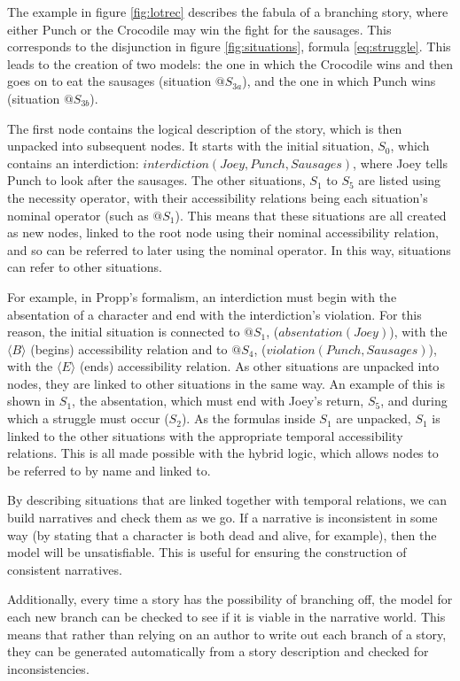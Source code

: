 \documentclass{llncs}
\begin{document}
The example in figure \ref{fig:lotrec} describes the fabula of a branching story, where either Punch or the Crocodile may win the fight for the sausages. This corresponds to the disjunction in figure \ref{fig:situations}, formula \ref{eq:struggle}. This leads to the creation of two models: the one in which the Crocodile wins and then goes on to eat the sausages (situation $@S_{3a}$), and the one in which Punch wins (situation $@S_{3b}$).

The first node contains the logical description of the story, which is then unpacked into subsequent nodes. It starts with the initial situation, $S_0$, which contains an interdiction: $\mathit{interdiction(Joey, Punch, Sausages)}$, where Joey tells Punch to look after the sausages. The other situations, $S_1$ to $S_5$ are listed using the necessity operator, with their accessibility relations being each situation's nominal operator (such as $@S_1$). This means that these situations are all created as new nodes, linked to the root node using their nominal accessibility relation, and so can be referred to later using the nominal operator. In this way, situations can refer to other situations.

For example, in Propp's formalism, an interdiction must begin with the absentation of a character and end with the interdiction's violation. For this reason, the initial situation is connected to $@S_1$, ($\mathit{absentation(Joey)}$), with the $\langle B \rangle$ (begins) accessibility relation and to $@S_4$, ($\mathit{violation(Punch, Sausages)}$), with the $\langle E \rangle$ (ends) accessibility relation. As other situations are unpacked into nodes, they are linked to other situations in the same way. An example of this is shown in $S_1$, the absentation, which must end with Joey's return, $S_5$, and during which a struggle must occur ($S_2$). As the formulas inside $S_1$ are unpacked, $S_1$ is linked to the other situations with the appropriate temporal accessibility relations. This is all made possible with the hybrid logic, which allows nodes to be referred to by name and linked to.

By describing situations that are linked together with temporal relations, we can build narratives and check them as we go. If a narrative is inconsistent in some way (by stating that a character is both dead and alive, for example), then the model will be unsatisfiable. This is useful for ensuring the construction of consistent narratives.

Additionally, every time a story has the possibility of branching off, the model for each new branch can be checked to see if it is viable in the narrative world. This means that rather than relying on an author to write out each branch of a story, they can be generated automatically from a story description and checked for inconsistencies.
\end{document}
